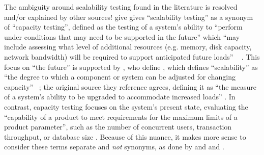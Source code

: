The ambiguity around scalability testing found in the literature is resolved
and/or explained by other sources! \ifnotpaper \citeauthor{IEEE2021} give
\else \cite[p.~39]{IEEE2021} gives \fi ``scalability testing'' as a synonym
of ``capacity testing'', defined
as the testing of a system's ability to ``perform under conditions that may
need to be supported in the future'' which ``may include assessing what level
of additional resources (e.g. memory, disk capacity, network bandwidth) will
be required to support anticipated future loads''%
\ifnotpaper \ \citeyearpar[p.~39]{IEEE2021}%
\fi. This focus on ``the future'' is supported by
\ifnotpaper \citeauthor{ISTQB_author}, who define
\else \cite{ISTQB}, which defines
\fi ``scalability'' as ``the degree to which a component or system can be
adjusted for changing capacity''%
\ifnotpaper \ \citeyearpar{ISTQB}; the original source
      they reference agrees, defining it as ``the measure of a system's ability to be
      upgraded to accommodate increased loads'' \citep[p.~381]{GerrardAndThompson2002}%
\fi. In contrast, capacity testing focuses on the system's present state, evaluating
the ``capability of a product to meet requirements for the maximum limits of a
product parameter'', such as the number of concurrent users, transaction
throughput, or database size \citep{ISO_IEC2023a}. Because of this nuance, it
makes more sense to consider these terms separate and \emph{not} synonyms, as
done by
\ifnotpaper \citet[p.~53]{Firesmith2015} and \citet[pp.~22-23]{Bas2024}%
\else \cite[p.~53]{Firesmith2015} and \cite[pp.~22-23]{Bas2024}%
\fi.

